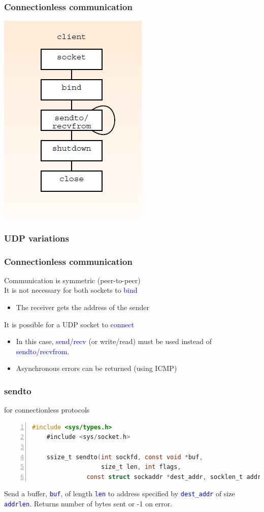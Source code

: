 \documentclass[12pt]{beamer}
\begin{document}
\begin{frame}
	\frametitle{Connectionless communication}
	\begin{center}
		\includegraphics[scale=.70]{images/connectionless.png} 
	\end{center}
\end{frame}

\begin{frame}
	\frametitle{UDP variations}
	\frametitle{Connectionless communication}
	{\footnotesize Communication is symmetric (peer-to-peer) \\It is not necessary for both sockets to \textcolor{blue}{bind}
	\begin{itemize}
		\item The receiver gets the address of the sender
	\end{itemize}
	It is possible for a UDP socket to \textcolor{blue}{connect}
	\begin{itemize}
		\item In this case, \textcolor{blue}{send/recv} (or write/read) must be used instead
of \textcolor{blue}{sendto/recvfrom}.
		\item Asynchronous errors can be returned (using ICMP)
	\end{itemize}
	}
\end{frame}

\begin{frame}[fragile]
	\frametitle{sendto}
	{\footnotesize for connectionless protocols}
	{\tiny
	\begin{lstlisting}[language=C, breaklines=true, commentstyle=\color{mygreen},frame=lrtb,  rulecolor=\color{black}, numbers=left,  numbersep=5pt, numberstyle=\tiny\color{mygray}]
	#include <sys/types.h>
	#include <sys/socket.h>

	ssize_t sendto(int sockfd, const void *buf, 
	               size_t len, int flags,
               const struct sockaddr *dest_addr, socklen_t addrlen);
	\end{lstlisting}}
	{\footnotesize
	Send a buffer, \texttt{\textcolor{blue}{buf}}, of length \texttt{\textcolor{blue}{len}} to address specified by \texttt{\textcolor{blue}{dest\_addr}} of size \texttt{\textcolor{blue}{addrlen}}. Returns number of bytes sent or -1 on error.
	}
\end{frame}	
\end{document}

